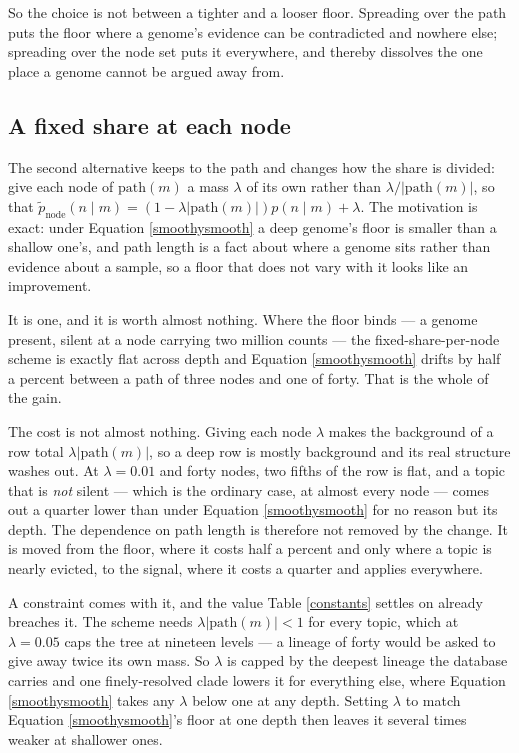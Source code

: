 \documentclass[pdflatex,sn-vancouver-num]{sn-jnl}
\begin{document}
\begin{appendices}
    So the choice is not between a tighter and a looser floor. Spreading over the path puts the floor
    where a genome's evidence can be contradicted and nowhere else; spreading over the node set puts
    it everywhere, and thereby dissolves the one place a genome cannot be argued away from.

    \subsection{A fixed share at each node}\label{nodesmoothper}
    The second alternative keeps to the path and changes how the share is divided: give each node of
    $\mathrm{path}(m)$ a mass $\lambda$ of its own rather than $\lambda / \lvert \mathrm{path}(m)
    \rvert$, so that $\tilde{p}_{\mathrm{node}}(n \mid m) = (1 - \lambda \lvert \mathrm{path}(m)
    \rvert) p(n \mid m) + \lambda$. The motivation is exact: under Equation \eqref{smoothysmooth} a deep genome's floor
    is smaller than a shallow one's, and path length is a fact about where a genome sits rather than
    evidence about a sample, so a floor that does not vary with it looks like an improvement.

    It is one, and it is worth almost nothing. Where the floor binds --- a genome present, silent at
    a node carrying two million counts --- the fixed-share-per-node scheme is exactly flat across
    depth and Equation \eqref{smoothysmooth} drifts by half a percent between a path of three nodes
    and one of forty. That is the whole of the gain.

    The cost is not almost nothing. Giving each node $\lambda$ makes the background of a row total
    $\lambda \lvert \mathrm{path}(m) \rvert$, so a deep row is mostly background and its real
    structure washes out. At $\lambda = 0.01$ and forty nodes, two fifths of the row is flat, and a
    topic that is \emph{not} silent --- which is the ordinary case, at almost every node --- comes
    out a quarter lower than under Equation \eqref{smoothysmooth} for no reason but its depth. The
    dependence on path length is therefore not removed by the change. It is moved from the floor,
    where it costs half a percent and only where a topic is nearly evicted, to the signal, where it
    costs a quarter and applies everywhere.

    A constraint comes with it, and the value Table \ref{constants} settles on already breaches it.
    The scheme needs $\lambda \lvert \mathrm{path}(m) \rvert < 1$ for every topic, which at
    $\lambda = 0.05$ caps the tree at nineteen levels --- a lineage of forty would be asked to give
    away twice its own mass. So $\lambda$ is capped by the deepest lineage the database carries and
    one finely-resolved clade lowers it for everything else, where
    Equation \eqref{smoothysmooth} takes any $\lambda$ below one at any depth. Setting $\lambda$ to match
    Equation \eqref{smoothysmooth}'s floor at one depth then leaves it several times weaker at
    shallower ones.


\end{appendices}
\end{document}
